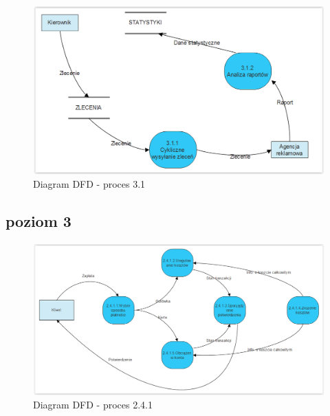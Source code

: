 \documentclass[a4paper, 11pt]{article}
\begin{document}
	\begin{figure}[H]%
			\center
			\includegraphics[scale=0.7]{Img/3-1.png}
			\caption{Diagram DFD - proces 3.1}
	\end{figure}
	
		
	\subsection{poziom 3}
	\indent
	\begin{figure}[H]%
			\center
			\includegraphics[scale=0.7]{Img/2-4-1.png}
			\caption{Diagram DFD - proces 2.4.1}
	\end{figure}		
	
	
	
\end{document}
